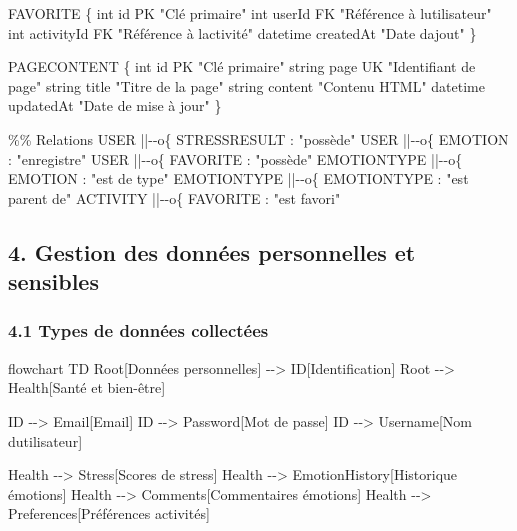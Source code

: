 \documentclass[
]{article}
\newenvironment{Shaded}{}{}
\newcommand{\NormalTok}[1]{#1}
\begin{document}
\begin{Shaded}
\begin{Highlighting}[]
\NormalTok{    FAVORITE \{}
\NormalTok{        int id PK "Clé primaire"}
\NormalTok{        int userId FK "Référence à l\textquotesingle{}utilisateur"}
\NormalTok{        int activityId FK "Référence à l\textquotesingle{}activité"}
\NormalTok{        datetime createdAt "Date d\textquotesingle{}ajout"}
\NormalTok{    \}}
    
\NormalTok{    PAGECONTENT \{}
\NormalTok{        int id PK "Clé primaire"}
\NormalTok{        string page UK "Identifiant de page"}
\NormalTok{        string title "Titre de la page"}
\NormalTok{        string content "Contenu HTML"}
\NormalTok{        datetime updatedAt "Date de mise à jour"}
\NormalTok{    \}}
    
\NormalTok{    \%\% Relations}
\NormalTok{    USER ||{-}{-}o\{ STRESSRESULT : "possède"}
\NormalTok{    USER ||{-}{-}o\{ EMOTION : "enregistre"}
\NormalTok{    USER ||{-}{-}o\{ FAVORITE : "possède"}
\NormalTok{    EMOTIONTYPE ||{-}{-}o\{ EMOTION : "est de type"}
\NormalTok{    EMOTIONTYPE ||{-}{-}o\{ EMOTIONTYPE : "est parent de"}
\NormalTok{    ACTIVITY ||{-}{-}o\{ FAVORITE : "est favori"}
\end{Highlighting}
\end{Shaded}

\subsection{4. Gestion des données personnelles et
sensibles}\label{gestion-des-donnuxe9es-personnelles-et-sensibles}

\subsubsection{4.1 Types de données
collectées}\label{types-de-donnuxe9es-collectuxe9es}

\begin{Shaded}
\begin{Highlighting}[]
\NormalTok{flowchart TD}
\NormalTok{    Root[Données personnelles] {-}{-}\textgreater{} ID[Identification]}
\NormalTok{    Root {-}{-}\textgreater{} Health[Santé et bien{-}être]}
    
\NormalTok{    ID {-}{-}\textgreater{} Email[Email]}
\NormalTok{    ID {-}{-}\textgreater{} Password[Mot de passe]}
\NormalTok{    ID {-}{-}\textgreater{} Username[Nom d\textquotesingle{}utilisateur]}
    
\NormalTok{    Health {-}{-}\textgreater{} Stress[Scores de stress]}
\NormalTok{    Health {-}{-}\textgreater{} EmotionHistory[Historique émotions]}
\NormalTok{    Health {-}{-}\textgreater{} Comments[Commentaires émotions]}
\NormalTok{    Health {-}{-}\textgreater{} Preferences[Préférences activités]}
\end{Highlighting}
\end{Shaded}
\end{document}
